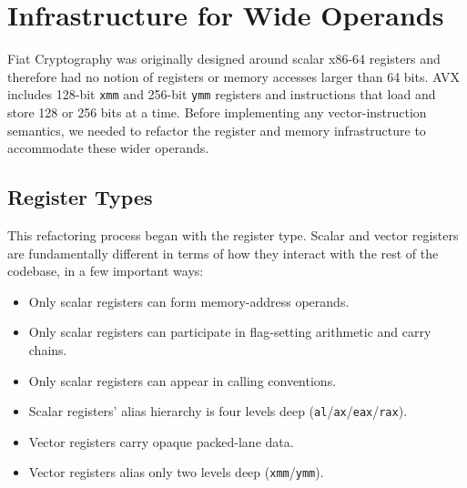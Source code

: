 


\chapter{Infrastructure for Wide Operands}
\label{ch:infrastructure}

Fiat Cryptography was originally designed around scalar x86-64 registers and therefore had no notion of registers or memory accesses larger than 64 bits.
AVX includes 128-bit \texttt{xmm} and 256-bit \texttt{ymm} registers and instructions that load and store 128 or 256 bits at a time.
Before implementing any vector-instruction semantics, we needed to refactor the register and memory infrastructure to accommodate these wider operands.

\section{Register Types}
\label{sec:reg-types}

This refactoring process began with the register type.
Scalar and vector registers are fundamentally different in terms of how they interact with the rest of the codebase, in a few important ways:

\begin{itemize}
    \item Only scalar registers can form memory-address operands.
    \item Only scalar registers can participate in flag-setting arithmetic and carry chains.
    \item Only scalar registers can appear in calling conventions.
    \item Scalar registers' alias hierarchy is four levels deep (\texttt{al}/\texttt{ax}/\texttt{eax}/\texttt{rax}).
    \item Vector registers carry opaque packed-lane data.
    \item Vector registers alias only two levels deep (\texttt{xmm}/\texttt{ymm}).
\end{itemize}

